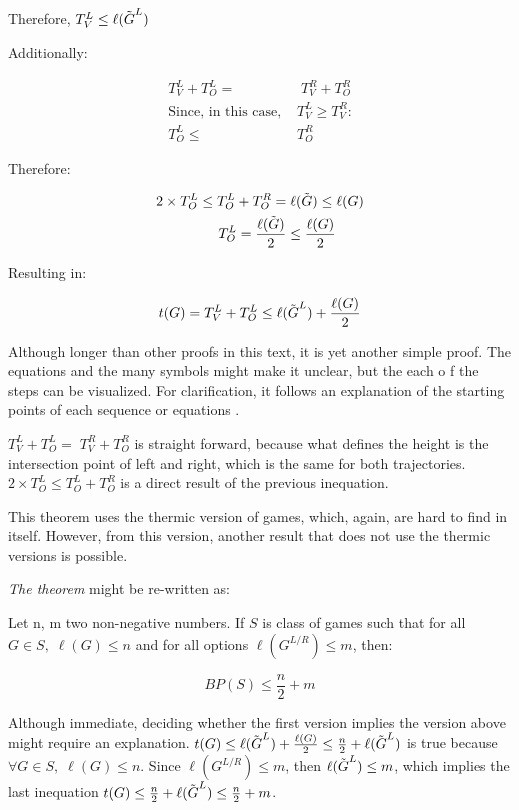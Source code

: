 Therefore, $T^L_V \leq \ell(\tilde{\mbox{$G$}}^L)$

Additionally:

\begin{align*}
T^L_V + T^L_O =&\;T^R_V+T^R_O\\
\text{Since, in this case, }& T^L_V \ge T^R_V\text{:}\\
T^L_O \leq&T^R_O
\end{align*}

Therefore:

\begin{align*}
	2\times T^L_O \leq T^L_O + T^R_O =&\;\ell(\tilde{\mbox{$G$}}) \leq \ell(\mbox{$G$})\\
	T^L_O = \frac{\ell(\tilde{\mbox{$G$}})}{2} &\leq \frac{\ell(\mbox{$G$})}{2}
\end{align*}

Resulting in:

$$
t(G) = T^L_V + T^L_O \leq \ell(\tilde{\mbox{$G$}}^L) + \frac{\ell(G)}{2}
$$

Although longer than other proofs in this text, it is yet another simple proof. The equations and the many symbols might make it unclear, but the each o f the steps can be visualized. For clarification, it follows an explanation of the starting points of each sequence or equations .

$T^L_V + T^L_O =\;T^R_V+T^R_O$ is straight forward, because what defines the height is the intersection point of left and right, which is the same for both trajectories. $2\times T^L_O \leq T^L_O + T^R_O$ is a direct result of the previous inequation. 

This theorem uses the thermic version of games, which, again, are hard to find in itself. However, from this version, another result that does not use the thermic versions is possible.

\textit{The theorem} might be re-written as:

Let n, m two non-negative numbers. If $S$ is class of games such that for all $G \in S,\;\ell(G) \leq n$ and for all options $\ell(G^{L/R}) \leq m$, then:

$$
BP(S) \leq \frac{n}{2} + m
$$

Although immediate, deciding whether the first version implies the version above might require an explanation. $t(G) \leq \ell(\tilde{\mbox{$G$}}^L) + \frac{\ell(G)}{2} \leq \frac{n}{2} + \ell(\tilde{\mbox{$G$}}^L)$ is true because $\forall G \in S,\;\ell(G) \leq n$. Since $\ell(G^{L/R}) \leq m$, then $\ell(\tilde{\mbox{$G$}}^L) \leq m$, which implies the last inequation $t(G) \leq \frac{n}{2} + \ell(\tilde{\mbox{$G$}}^L) \leq \frac{n}{2} + m$.

